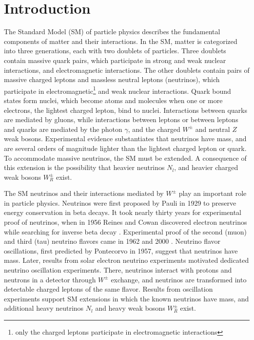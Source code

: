 \chapter{Introduction}
\label{intro_chapter}
The Standard Model (SM) of particle physics describes the fundamental components of matter and their interactions.  
In the SM, matter is categorized into three generations, each with two doublets of particles.  Three doublets 
contain massive quark pairs, which participate in strong and weak nuclear interactions, and electromagnetic interactions.  
The other doublets contain pairs of massive charged leptons and massless neutral leptons (neutrinos), which 
participate in electromagnetic\footnote{only the charged leptons participate in electromagnetic interactions} and weak nuclear interactions.  Quark bound states form nuclei, which become atoms 
and molecules when one or more electrons, the lightest charged lepton, bind to nuclei.  Interactions between quarks 
are mediated by gluons, while interactions between leptons or between leptons and quarks are mediated by the photon $\gamma$, 
and the charged $W^{\pm}$ and neutral $Z$ weak bosons.  Experimental evidence \cite{NOvAresults,mainzPhaseIIResults,t2kResults} 
substantiates that neutrinos have mass, and are several orders of magnitude lighter than the lightest charged 
lepton or quark.  To accommodate massive neutrinos, the SM must be extended.  A consequence of this extension is the 
possibility that heavier neutrinos $N_{l}$, and heavier charged weak bosons $W^{\pm}_{R}$ exist.

The SM neutrinos and their interactions mediated by $W^{\pm}$ play an important role in particle 
physics.  Neutrinos were first proposed by Pauli in 1929 to preserve energy conservation in beta decays.  It took 
nearly thirty years for experimental proof of neutrinos, when in 1956 Reines and Cowan discovered electron neutrinos while 
searching for inverse beta decay \cite{firstNuDiscovery}.  Experimental proof of the second (muon) and third (tau) neutrino flavors came in 
1962 \cite{muNuDiscovery} and 2000 \cite{tauNuDiscovery}.  Neutrino flavor oscillations, first predicted by Pontecorvo in 1957, suggest that 
neutrinos have mass.  Later, results from solar electron neutrino experiments \cite{kamiokandeTwo,solarNuSummary} motivated 
dedicated neutrino oscillation experiments.  There, neutrinos interact with protons and neutrons in a detector through 
$W^{\pm}$ exchange, and neutrinos are transformed into detectable charged leptons of the same flavor.  Results from 
oscillation experiments support SM extensions in which the known neutrinos have mass, and additional heavy neutrinos 
$N_{l}$ and heavy weak bosons $W^{\pm}_{R}$ exist.

